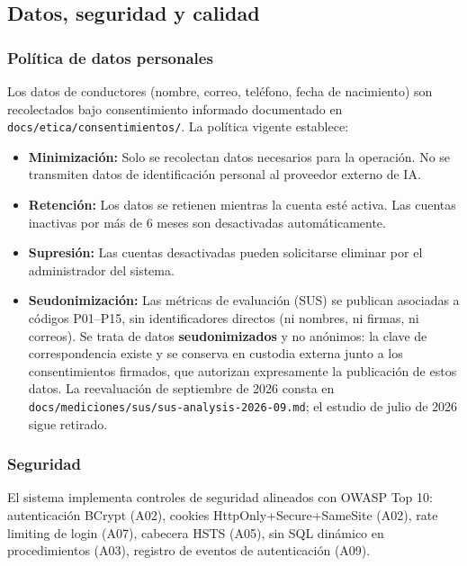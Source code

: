\documentclass[11pt,a4paper]{article}
\begin{document}
\subsection{Datos, seguridad y calidad}

\subsubsection*{Política de datos personales}
Los datos de conductores (nombre, correo, teléfono, fecha de nacimiento) son recolectados bajo consentimiento informado documentado en \texttt{docs/etica/consentimientos/}. La política vigente establece:
\begin{itemize}[label=\textbf{--}]
    \item \textbf{Minimización:} Solo se recolectan datos necesarios para la operación. No se transmiten datos de identificación personal al proveedor externo de IA.
    \item \textbf{Retención:} Los datos se retienen mientras la cuenta esté activa. Las cuentas inactivas por más de 6 meses son desactivadas automáticamente.
    \item \textbf{Supresión:} Las cuentas desactivadas pueden solicitarse eliminar por el administrador del sistema.
    \item \textbf{Seudonimización:} Las métricas de evaluación (SUS) se publican asociadas a códigos P01–P15, sin identificadores directos (ni nombres, ni firmas, ni correos). Se trata de datos \textbf{seudonimizados} y no anónimos: la clave de correspondencia existe y se conserva en custodia externa junto a los consentimientos firmados, que autorizan expresamente la publicación de estos datos. La reevaluación de septiembre de 2026 consta en \texttt{docs/mediciones/sus/sus-analysis-2026-09.md}; el estudio de julio de 2026 sigue retirado.
\end{itemize}

\subsubsection*{Seguridad}
El sistema implementa controles de seguridad alineados con OWASP Top 10: autenticación BCrypt (A02), cookies HttpOnly+Secure+SameSite (A02), rate limiting de login (A07), cabecera HSTS (A05), sin SQL dinámico en procedimientos (A03), registro de eventos de autenticación (A09).
\end{document}
